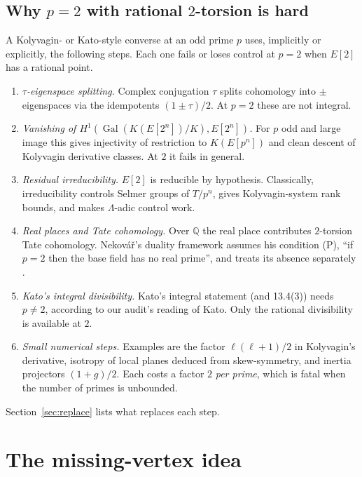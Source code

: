 \documentclass[11pt]{article}
\theoremstyle{remark}
\newcommand{\Q}{\mathbb Q}
\DeclareMathOperator{\Gal}{Gal}
\begin{document}
\subsection{Why $p=2$ with rational $2$-torsion is hard}
\label{sec:hard}
A Kolyvagin- or Kato-style converse at an odd prime $p$ uses, implicitly or
explicitly, the following steps. Each one fails or loses control at $p=2$
when $E[2]$ has a rational point.
\begin{enumerate}[label=(\roman*)]
\item \emph{$\tau$-eigenspace splitting.} Complex conjugation $\tau$ splits
 cohomology into $\pm$ eigenspaces via the idempotents $(1\pm\tau)/2$.
 At $p=2$ these are not integral.
\item \emph{Vanishing of $H^1(\Gal(K(E[2^n])/K),E[2^n])$.} For $p$ odd and
 large image this gives injectivity of restriction to $K(E[p^n])$ and
 clean descent of Kolyvagin derivative classes. At $2$ it fails in general.
\item \emph{Residual irreducibility.} $E[2]$ is reducible by hypothesis.
 Classically, irreducibility controls Selmer groups of $T/p^n$, gives
 Kolyvagin-system rank bounds, and makes $\Lambda$-adic control work.
\item \emph{Real places and Tate cohomology.} Over $\Q$ the real place
 contributes $2$-torsion Tate cohomology. Nekov\'a\v{r}'s duality framework
 assumes his condition (P), ``if $p=2$ then the base field has no real
 prime'', and treats its absence separately
 \cite[\S\S5.7, 6.9]{Nekovar2006}.
\item \emph{Kato's integral divisibility.} Kato's integral statement
 \cite[12.5(4)]{Kato2004} (and 13.4(3)) needs $p\ne2$, according to our
 audit's reading of Kato. Only the rational divisibility \cite[12.5(3)]{Kato2004}
 is available at $2$.
\item \emph{Small numerical steps.} Examples are the factor
 $\ell(\ell+1)/2$ in Kolyvagin's derivative, isotropy of local planes
 deduced from skew-symmetry, and inertia projectors $(1+g)/2$. Each costs
 a factor $2$ \emph{per prime}, which is fatal when the number of primes is
 unbounded.
\end{enumerate}
Section~\ref{sec:replace} lists what replaces each step.

\section{The missing-vertex idea}
\label{sec:mv}
\end{document}
